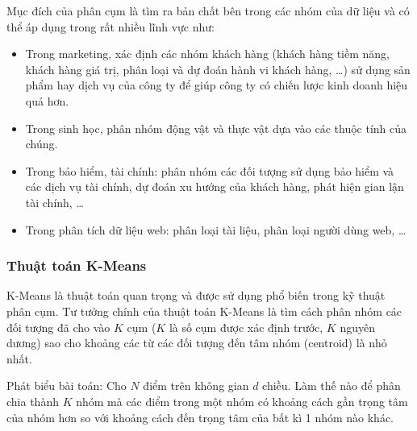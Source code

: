 Mục đích của phân cụm là tìm ra bản chất bên trong các
nhóm của dữ liệu và có thể  áp dụng trong rất nhiều lĩnh vực như:
\begin{itemize}[topsep=0ex]
\item Trong marketing, xác định các nhóm khách hàng (khách hàng tiềm
    năng, khách hàng giá trị, phân loại và dự đoán hành vi khách
    hàng, …) sử dụng sản phẩm hay dịch vụ của công ty để giúp
    công ty có chiến lược kinh doanh hiệu quả hơn.

\item Trong sinh học, phân nhóm động vật và thực vật
    dựa vào các thuộc tính của chúng.

\item  Trong bảo hiểm, tài chính: phân nhóm các đối tượng
    sử dụng bảo hiểm và các dịch vụ tài chính, dự đoán xu hướng
    của khách hàng, phát hiện gian lận tài chính, …

\item Trong phân tích dữ liệu web: phân loại tài liệu, phân
    loại người dùng web, …
\end{itemize}

\subsubsection{Thuật toán K-Means}
K-Means là thuật toán quan trọng và được sử dụng phổ biến
trong kỹ thuật phân cụm. Tư tưởng chính của thuật toán K-Means
là tìm cách phân nhóm các đối tượng đã cho vào $K$ cụm ($K$ là
số cụm được xác định trước, $K$ nguyên dương) sao cho khoảng các từ
các đối tượng đến tâm nhóm (centroid) là nhỏ nhất.

Phát biểu bài toán: Cho $N$ điểm trên không gian $d$ chiều.
Làm thế nào để phân chia thành $K$ nhóm mà các điểm trong
một nhóm có khoảng cách gần trọng tâm của nhóm hơn so với
khoảng cách đến trọng tâm của bất kì 1 nhóm nào khác.

